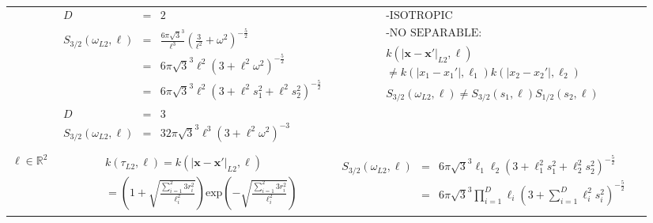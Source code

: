 \documentclass[onecolumn,a4paper,11pt]{article}
\begin{document}
\begin{landscape}
\begin{table}[H]
\begin{center}
\begin{tabular}{|c|c|c|c|}
       & \multicolumn{1}{|p{7.5cm}|}{\small
         \begin{eqnarray*}
		D &=& 2\\
		\\
		S_{3/2}(\omega_{L2},\ell) &=& \frac{6\pi\sqrt{3}^3}{\ell^3}\left(\frac{3}{\ell^2}+\omega^2 \right)^{-\frac{5}{2}} \\
		&=& 6\pi\sqrt{3}^3\ell^2\left(3+\ell^2\omega^2 \right)^{-\frac{5}{2}} \\
		&=& 6\pi\sqrt{3}^3\ell^2\left(3+\ell^2s_1^2+\ell^2s_2^2 \right)^{-\frac{5}{2}} \\
		\\
		D &=& 3\\
		S_{3/2}(\omega_{L2},\ell) &=& 32\pi\sqrt{3}^3\ell^3\left(3+\ell^2\omega^2 \right)^{-3}
         \end{eqnarray*}
       }
       
       & \multicolumn{1}{|p{6.2cm}|}{\small
         \begin{eqnarray*}
        &&\text{-ISOTROPIC}\\
        \\
		&&\text{-NO SEPARABLE:} \\
		\\
		&&k(|\bm{x}-\bm{x}'|_{L2},\bm{\ell})\\
		 &&\neq k(|x_1-x_1'|,\ell_1)k(|x_2-x_2'|,\ell_2)\\
		 \\
		&&S_{3/2}(\omega_{L2},\ell)\neq S_{3/2}(s_1,\ell)S_{1/2}(s_2,\ell)
         \end{eqnarray*} 
       }\\
       \vspace{-10mm}\\
        \cline{1-3}
         
       \multicolumn{1}{|p{1.5cm}|}{
       \vspace{1mm}
       $\bm{\ell} \in \mathbb{R}^2$
       }
       
         & \multicolumn{1}{|p{7.2cm}|}{\small
         \begin{eqnarray*}
		&&k(\tau_{L2},\bm{\ell}) = k(|\bm{x}-\bm{x}'|_{L2},\bm{\ell})\\
		&&= \left(1+\sqrt{\frac{\sum_{i=1}^{2}3r_i^2}{\ell_i^2}} \right)\mathrm{exp}\left(-\sqrt{\frac{\sum_{i=1}^{2}3r_i^2}{\ell_i^2}} \right)
         \end{eqnarray*}
       }
       
       & \multicolumn{1}{|p{7.2cm}|}{\small
         \begin{eqnarray*}
		S_{3/2}(\omega_{L2},\bm{\ell}) &=& 6\pi\sqrt{3}^3\ell_1\ell_2\left(3+\ell_1^2s_1^2+\ell_2^2s_2^2 \right)^{-\frac{5}{2}} \\
		&=& 6\pi\sqrt{3}^3\prod_{i=1}^{D}\ell_i\left(3+\sum_{i=1}^{D}\ell_i^2s_i^2 \right)^{-\frac{5}{2}} \\
         \end{eqnarray*}
       }
       

\end{tabular}
\end{center}
\end{table}
\end{landscape}
\end{document}
